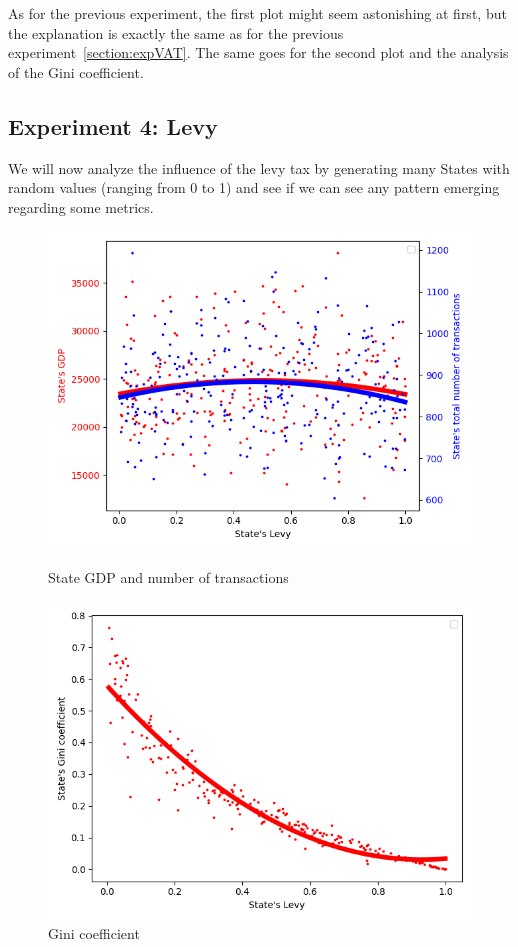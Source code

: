 {{        As for the previous experiment, the first plot might seem astonishing at first, but the explanation is exactly the same as for the previous experiment~\ref{section:expVAT}. The same goes for the second plot and the analysis of the Gini coefficient.


    \subsection{Experiment 4: Levy}\label{exp:levy}
    We will now analyze the influence of the levy tax by generating many States with random values (ranging from 0 to 1) and see if we can see any pattern emerging regarding some metrics. 

        \begin{figure}[H]
                \includegraphics[width=\linewidth]{img/exp/4_1.png}
                \caption{State GDP and number of transactions}
            \endminipage\hfill
                \includegraphics[width=\linewidth]{img/exp/4_3.png}
                \caption{Gini coefficient}
            \endminipage\hfill
        \end{figure}

}}
